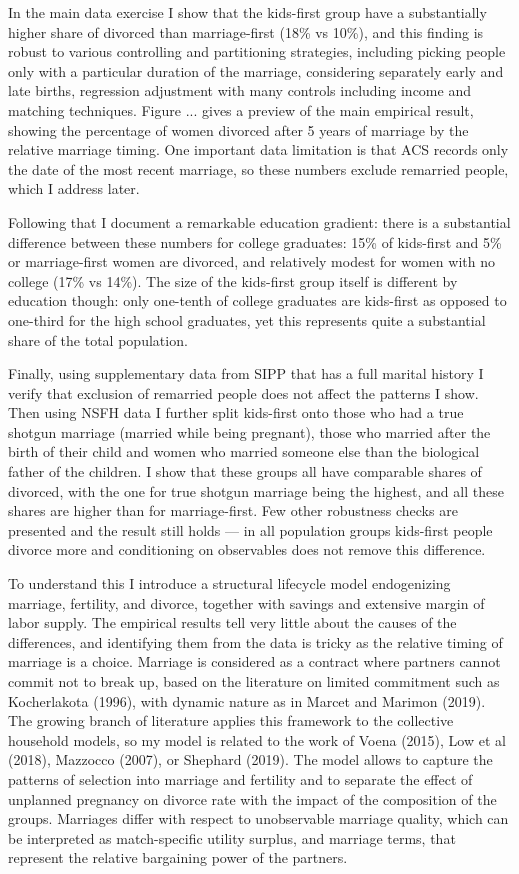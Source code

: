 \documentclass[12pt,letter]{article}
\begin{document}
In the main data exercise I show that the kids-first group have a substantially higher share of divorced than marriage-first (18\% vs 10\%), and this finding is robust to various controlling and partitioning strategies, including picking people only with a particular duration of the marriage, considering separately early and late births, regression adjustment with many controls including income and matching techniques. Figure ... gives a preview of the main empirical result, showing the percentage of women divorced after 5 years of marriage by the relative marriage timing. One important data limitation is that ACS records only the date of the most recent marriage, so these numbers exclude remarried people, which I address later.

Following that I document a remarkable education gradient: there is a substantial difference between these numbers for college graduates: 15\% of kids-first and 5\% or marriage-first women are divorced, and relatively modest for women with no college (17\% vs 14\%). The size of the kids-first group itself is different by education though: only one-tenth of college graduates are kids-first as opposed to one-third for the high school graduates, yet this represents quite a substantial share of the total population.

Finally, using supplementary data from SIPP that has a full marital history I verify that exclusion of remarried people does not affect the patterns I show. Then using NSFH data I further split kids-first onto those who had a true shotgun marriage (married while being pregnant), those who married after the birth of their child and women who married someone else than the biological father of the children. I show that these groups all have comparable shares of divorced, with the one for true shotgun marriage being the highest, and all these shares are higher than for marriage-first. Few other robustness checks are presented and the result still holds --- in all population groups kids-first people divorce more and conditioning on observables does not remove this difference.

To understand this I introduce a structural lifecycle model endogenizing marriage, fertility, and divorce, together with savings and extensive margin of labor supply. The empirical results tell very little about the causes of the differences, and identifying them from the data is tricky as the relative timing of marriage is a choice. 
Marriage is considered as a contract where partners cannot commit not to break up, based on the literature on limited commitment such as Kocherlakota (1996), with dynamic nature as in Marcet and Marimon (2019). The growing branch of literature applies this framework to the collective household models, so my model is related to the work of Voena (2015), Low et al (2018), Mazzocco (2007), or Shephard (2019). The model allows to capture the patterns of selection into marriage and fertility and to separate the effect of unplanned pregnancy on divorce rate with the impact of the composition of the groups. Marriages differ with respect to unobservable marriage quality, which can be interpreted as match-specific utility surplus, and marriage terms, that represent the relative bargaining power of the partners.
\end{document}
